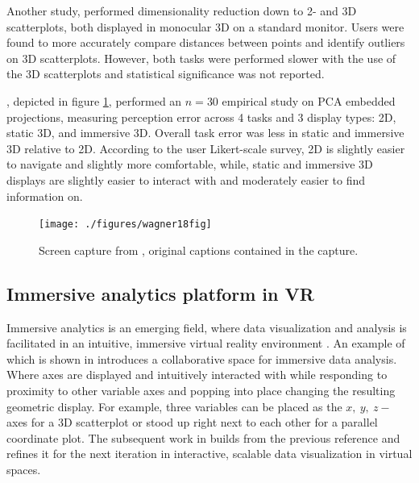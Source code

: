 \documentclass{monashthesis}
\begin{document}
Another study, \textcite{gracia_new_2016} performed dimensionality reduction down to 2- and 3D scatterplots, both displayed in monocular 3D on a standard monitor. Users were found to more accurately compare distances between points and identify outliers on 3D scatterplots. However, both tasks were performed slower with the use of the 3D scatterplots and statistical significance was not reported.

\textcite{wagner_filho_immersive_2018}, depicted in figure \ref{fig:wagner18fig}, performed an \(n=30\) empirical study on PCA embedded projections, measuring perception error across 4 tasks and 3 display types: 2D, static 3D, and immersive 3D. Overall task error was less in static and immersive 3D relative to 2D. According to the user Likert-scale survey, 2D is slightly easier to navigate and slightly more comfortable, while, static and immersive 3D displays are slightly easier to interact with and moderately easier to find information on.



\begin{figure}

{\centering \texttt{[image: ./figures/wagner18fig]} 

}

\caption{Screen capture from \textcite{wagner_filho_immersive_2018}, original captions contained in the capture.}\label{fig:wagner18fig}
\end{figure}

\hypertarget{immersive-analytics-platform-in-vr}{%
\subsection{Immersive analytics platform in VR}\label{immersive-analytics-platform-in-vr}}

Immersive analytics is an emerging field, where data visualization and analysis is facilitated in an intuitive, immersive virtual reality environment \autocite{chandler_immersive_2015,cordeil_immersive_2017}. An example of which is shown in \textcite{cordeil_imaxes:_2017} introduces a collaborative space for immersive data analysis. Where axes are displayed and intuitively interacted with while responding to proximity to other variable axes and popping into place changing the resulting geometric display. For example, three variables can be placed as the \(x,~y,~z-\) axes for a 3D scatterplot or stood up right next to each other for a parallel coordinate plot. The subsequent work in \textcite{cordeil_iatk:_2019} builds from the previous reference and refines it for the next iteration in interactive, scalable data visualization in virtual spaces.
\end{document}

